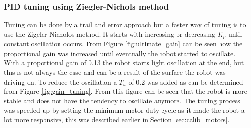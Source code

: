 \subsubsection{PID tuning using Ziegler-Nichols method}


Tuning can be done by a trail and error approach but a faster way of tuning is to use the Zigeler-Nicholos method.
It starts with increasing or decreasing $K_{p}$ until constant oscillation occurs.
From Figure \ref{fig:ultimate_gain} can be seen how the proportional gain was increased until eventually the robot started to oscillate.
With a proportional gain of 0.13 the robot starts light oscillation at the end, but this is not always the case and can be a result of the surface the robot was driving on.
To reduce the oscillation a $T_{u}$ of 0.2 was added as can be determined from Figure \ref{fig:gain_tuning}.
From this figure can be seen that the robot is more stable and does not have the tendency to oscillate anymore.
The tuning process was speeded up by setting the minimum motor duty cycle as it made the robot a lot more responsive, this was described earlier in Section \ref{sec:calib_motors}.


